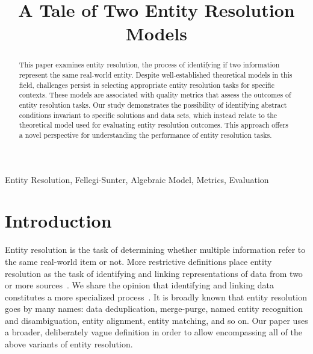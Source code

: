\documentclass[journal]{IEEEtran}
\begin{document}
    \title{A Tale of Two Entity Resolution Models}
    \author{
    }

    \maketitle

    \theoremstyle{definition}
    \newtheorem{defn}{Definition}[section]
    
    \maketitle
    \begin{abstract}
        This paper examines entity resolution, the process of identifying if two
        information represent the same real-world entity.
        Despite well-established theoretical models in this field, challenges
        persist in selecting appropriate entity resolution tasks for specific
        contexts.
        These models are associated with quality metrics that assess the
        outcomes of entity resolution tasks.
        Our study demonstrates the possibility of identifying abstract
        conditions invariant to specific solutions and data sets, which instead
        relate to the theoretical model used for evaluating entity resolution
        outcomes.
        This approach offers a novel perspective for understanding the
        performance of entity resolution tasks.
    \end{abstract}

    \begin{IEEEkeywords}
        Entity Resolution, Fellegi-Sunter, Algebraic Model, Metrics, Evaluation
    \end{IEEEkeywords}

    \section{Introduction}\label{sec:Introduction}
    Entity resolution is the task of determining whether multiple information
    refer to the same real-world item or not.
    More restrictive definitions place entity resolution as the task of
    identifying and linking representations of data from two or more
    sources~\cite{Qia17}.
    We share the opinion that identifying and linking data constitutes a more
    specialized process~\cite{Tal11}.
    It is broadly known that entity resolution goes by many names: data
    deduplication, merge-purge, named entity recognition and disambiguation,
    entity alignment, entity matching, and so on.
    Our paper uses a broader, deliberately vague definition in order to allow
    encompassing all of the above variants of entity resolution.
    
\end{document}
